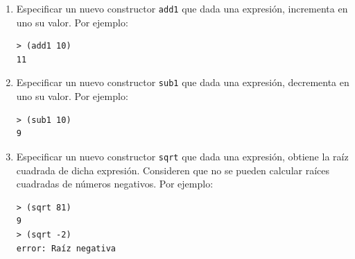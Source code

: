 \documentclass{article}
\begin{document}
\begin{enumerate}
\begin{enumerate}
        \item Especificar un nuevo constructor \texttt{add1} que dada una expresión, incrementa en uno su valor. Por ejemplo:
          \begin{verbatim}
> (add1 10)
11
          \end{verbatim}

        \item Especificar un nuevo constructor \texttt{sub1} que dada una expresión, decrementa en uno su valor. Por ejemplo:
          \begin{verbatim}
> (sub1 10)
9
          \end{verbatim}

        \item Especificar un nuevo constructor \texttt{sqrt} que dada una expresión, obtiene la raíz cuadrada de dicha expresión. Consideren que no se pueden calcular raíces cuadradas de números negativos. Por ejemplo:
          \begin{verbatim}
> (sqrt 81)
9
> (sqrt -2)
error: Raíz negativa
          \end{verbatim}
      \end{enumerate}

  \end{enumerate}
\end{document}
